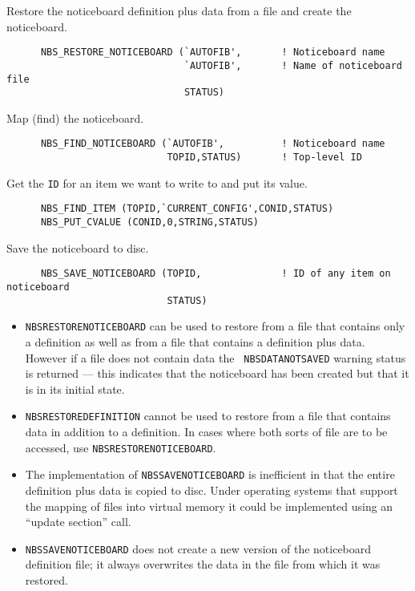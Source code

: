 \documentclass[twoside,11pt]{article}
\renewcommand{\_}{\texttt{\symbol{95}}}
\begin{document}
Restore the noticeboard definition plus data from a file and create the
noticeboard.

\begin {verbatim}
      NBS_RESTORE_NOTICEBOARD (`AUTOFIB',       ! Noticeboard name
                               `AUTOFIB',       ! Name of noticeboard file
                               STATUS)
\end{verbatim}

Map (find) the noticeboard.

\begin {verbatim}
      NBS_FIND_NOTICEBOARD (`AUTOFIB',          ! Noticeboard name
                            TOPID,STATUS)       ! Top-level ID
\end{verbatim}

Get the {\tt ID} for an item we want to write to and put its value.

\begin {verbatim}
      NBS_FIND_ITEM (TOPID,`CURRENT_CONFIG',CONID,STATUS)
      NBS_PUT_CVALUE (CONID,0,STRING,STATUS)
\end{verbatim}

Save the noticeboard to disc.

\begin {verbatim}
      NBS_SAVE_NOTICEBOARD (TOPID,              ! ID of any item on noticeboard
                            STATUS)
\end{verbatim}

\begin {itemize}
\item {\tt NBS\_RESTORE\_NOTICEBOARD} can be used to restore from a file
that contains only a definition as well as from a file that contains a
definition plus data. However if a file does not contain data the {\tt
NBS\_\_DATANOTSAVED} warning status is returned --- this indicates that the
noticeboard has been created but that it is in its initial state.
\item {\tt NBS\_RESTORE\_DEFINITION} cannot be used to restore from a file
that contains data in addition to a definition. In cases where both sorts
of file are to be accessed, use {\tt NBS\_RESTORE\_NOTICEBOARD}.
\item The implementation of {\tt NBS\_SAVE\_NOTICEBOARD} is inefficient
in that the entire definition plus data is copied to disc. Under operating
systems that support the mapping of files into virtual memory it could be
implemented using an ``update section'' call.
\item {\tt NBS\_SAVE\_NOTICEBOARD} does not create a new version of the
noticeboard definition file; it always overwrites the data in the file from
which it was restored.
\end {itemize}
\end{document}
